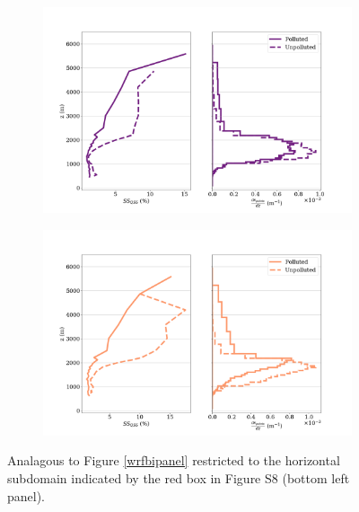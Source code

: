\documentclass{article}
\begin{document}
\begin{figure}[ht]
	\centering
	\begin{subfigure}{0.7\textwidth}
		\includegraphics[width=\textwidth]{revmywrf/v2_FINAL_subdom_bipanel_ss_qss_vs_z_allpts_figure.png}
		\caption{}
		\label{wrfsubdombipanelallpts}
	\end{subfigure}
	\begin{subfigure}{0.7\textwidth}
		\includegraphics[width=\textwidth]{revmywrf/v2_FINAL_subdom_bipanel_ss_qss_vs_z_up10perc_figure.png}
		\caption{}
		\label{wrfsubdombipanelup50perc}
	\end{subfigure}
	\caption{Analagous to Figure \ref{wrfbipanel} restricted to the horizontal subdomain indicated by the red box in Figure S8 (bottom left panel).}
	\label{wrfsubdombipanel}
\end{figure}
\end{document}
